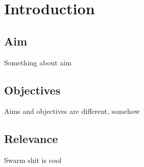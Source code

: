 \chapter{Introduction}
\label{chap:Introduction}

\section{Aim}
Something about aim

\section{Objectives}
Aims and objectives are different, somehow

\section{Relevance}
Swarm shit is cool